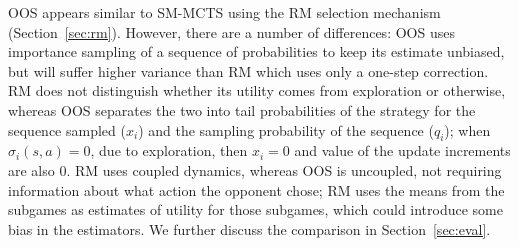 OOS appears similar to SM-MCTS using the RM selection mechanism (Section~\ref{sec:rm}). However, there are a number of differences:
OOS uses importance sampling of a sequence of probabilities to keep its estimate unbiased, but will suffer higher variance than RM which uses only a one-step correction.
RM does not distinguish whether its utility comes from exploration or otherwise, whereas OOS separates the two into tail probabilities of the strategy for the sequence
sampled ($x_i$) and the sampling probability of the sequence ($q_i$); when $\sigma_i(s,a) = 0$, due to exploration, then $x_i = 0$ and value of the update increments
are also $0$. RM uses coupled dynamics, whereas OOS is uncoupled, not requiring information about what action the opponent chose; RM uses the means from the subgames
as estimates of utility for those subgames, which could introduce some bias in the estimators. We further discuss the comparison in Section~\ref{sec:eval}.


